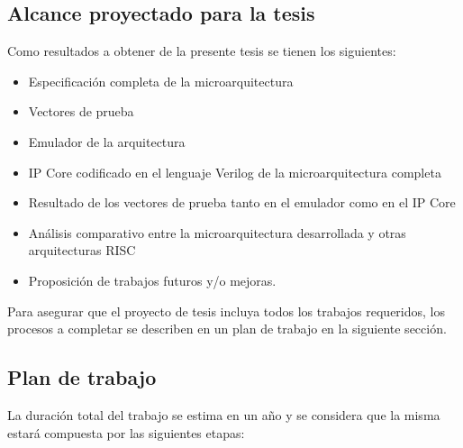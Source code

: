 \documentclass[a4paper]{article}
\begin{document}
\subsection{Alcance proyectado para la tesis}

Como resultados a obtener de la presente tesis se tienen los siguientes:

\begin{itemize}
    \item Especificación completa de la microarquitectura
    \item Vectores de prueba
    \item Emulador de la arquitectura
    \item IP Core codificado en el lenguaje Verilog de la microarquitectura completa
    \item Resultado de los vectores de prueba tanto en el emulador como en el IP Core
    \item Análisis comparativo entre la microarquitectura desarrollada y otras arquitecturas RISC
    \item Proposición de trabajos futuros y/o mejoras.
\end{itemize}

Para asegurar que el proyecto de tesis incluya todos los trabajos requeridos, los procesos a completar se describen en un plan de trabajo en la siguiente sección.

\newpage

\subsection{Plan de trabajo}


La duración total del trabajo se estima en un año y se considera que la misma estará compuesta por las siguientes etapas:
\end{document}
